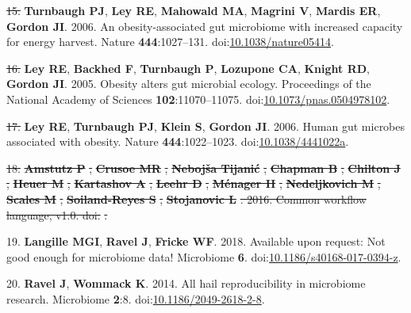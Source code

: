 \documentclass[]{article}
\providecommand{\DIFaddtex}[1]{{\protect\color{blue}\uwave{#1}}} %
\providecommand{\DIFdeltex}[1]{{\protect\color{red}\sout{#1}}}                      %
\providecommand{\DIFaddbegin}{} %
\providecommand{\DIFaddend}{} %
\providecommand{\DIFdelbegin}{} %
\providecommand{\DIFdelend}{} %
\providecommand{\DIFadd}[1]{\texorpdfstring{\DIFaddtex{#1}}{#1}} %
\providecommand{\DIFdel}[1]{\texorpdfstring{\DIFdeltex{#1}}{}} %
\begin{document}
\hypertarget{ref-Turnbaugh2006}{}
\DIFdelbegin \DIFdel{15. }\DIFdelend \DIFaddbegin \DIFadd{16. }\DIFaddend \textbf{Turnbaugh PJ}, \textbf{Ley RE}, \textbf{Mahowald MA},
\textbf{Magrini V}, \textbf{Mardis ER}, \textbf{Gordon JI}. 2006. An
obesity-associated gut microbiome with increased capacity for energy
harvest. Nature \textbf{444}:1027--131.
doi:\href{https://doi.org/10.1038/nature05414}{10.1038/nature05414}.

\hypertarget{ref-Ley2005}{}
\DIFdelbegin \DIFdel{16. }\DIFdelend \DIFaddbegin \DIFadd{17. }\DIFaddend \textbf{Ley RE}, \textbf{Backhed F}, \textbf{Turnbaugh P},
\textbf{Lozupone CA}, \textbf{Knight RD}, \textbf{Gordon JI}. 2005.
Obesity alters gut microbial ecology. Proceedings of the National
Academy of Sciences \textbf{102}:11070--11075.
doi:\href{https://doi.org/10.1073/pnas.0504978102}{10.1073/pnas.0504978102}.

\hypertarget{ref-Ley2006}{}
\DIFdelbegin \DIFdel{17. }\DIFdelend \DIFaddbegin \DIFadd{18. }\DIFaddend \textbf{Ley RE}, \textbf{Turnbaugh PJ}, \textbf{Klein S},
\textbf{Gordon JI}. 2006. Human gut microbes associated with obesity.
Nature \textbf{444}:1022--1023.
doi:\href{https://doi.org/10.1038/4441022a}{10.1038/4441022a}.

\DIFdelbegin %
\DIFdel{18. }\textbf{\DIFdel{Amstutz P}}%
\DIFdel{, }\textbf{\DIFdel{Crusoe MR}}%
\DIFdel{, }\textbf{\DIFdel{Nebojša Tijanić}}%
\DIFdel{,
}\textbf{\DIFdel{Chapman B}}%
\DIFdel{, }\textbf{\DIFdel{Chilton J}}%
\DIFdel{, }\textbf{\DIFdel{Heuer M}}%
\DIFdel{,
}\textbf{\DIFdel{Kartashov A}}%
\DIFdel{, }\textbf{\DIFdel{Leehr D}}%
\DIFdel{, }\textbf{\DIFdel{Ménager H}}%
\DIFdel{,
}\textbf{\DIFdel{Nedeljkovich M}}%
\DIFdel{, }\textbf{\DIFdel{Scales M}}%
\DIFdel{, }\textbf{\DIFdel{Soiland-Reyes S}}%
\DIFdel{,
}\textbf{\DIFdel{Stojanovic L}}%
\DIFdel{. 2016. Common workflow language, v1.0.
doi:}%
\DIFdel{.
}%

\DIFdelend \hypertarget{ref-Langille2018}{}
19. \textbf{Langille MGI}, \textbf{Ravel J}, \textbf{Fricke WF}. 2018.
Available upon request: Not good enough for microbiome data! Microbiome
\textbf{6}.
doi:\href{https://doi.org/10.1186/s40168-017-0394-z}{10.1186/s40168-017-0394-z}.

\hypertarget{ref-Ravel2014}{}
20. \textbf{Ravel J}, \textbf{Wommack K}. 2014. All hail reproducibility
in microbiome research. Microbiome \textbf{2}:8.
doi:\href{https://doi.org/10.1186/2049-2618-2-8}{10.1186/2049-2618-2-8}.
\end{document}
